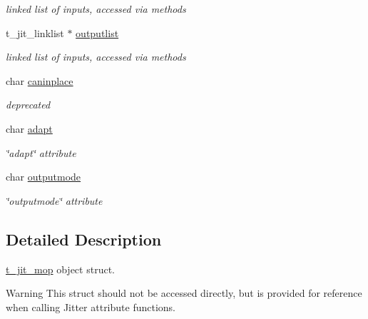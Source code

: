 \begin{DoxyCompactItemize}
\begin{DoxyCompactList}\small\item\em linked list of inputs, accessed via methods \item\end{DoxyCompactList}\item 
\hypertarget{structt__jit__mop_a2aa1e3e9da27a0eb73782d2037c97f73}{
t\_\-jit\_\-linklist $\ast$ \hyperlink{structt__jit__mop_a2aa1e3e9da27a0eb73782d2037c97f73}{outputlist}}
\label{structt__jit__mop_a2aa1e3e9da27a0eb73782d2037c97f73}

\begin{DoxyCompactList}\small\item\em linked list of inputs, accessed via methods \item\end{DoxyCompactList}\item 
\hypertarget{structt__jit__mop_a16b822869bef5cc50b3554cee5fddfeb}{
char \hyperlink{structt__jit__mop_a16b822869bef5cc50b3554cee5fddfeb}{caninplace}}
\label{structt__jit__mop_a16b822869bef5cc50b3554cee5fddfeb}

\begin{DoxyCompactList}\small\item\em deprecated \item\end{DoxyCompactList}\item 
\hypertarget{structt__jit__mop_a39634f1f344b51cf525f479e20eacf9b}{
char \hyperlink{structt__jit__mop_a39634f1f344b51cf525f479e20eacf9b}{adapt}}
\label{structt__jit__mop_a39634f1f344b51cf525f479e20eacf9b}

\begin{DoxyCompactList}\small\item\em \char`\"{}adapt\char`\"{} attribute \item\end{DoxyCompactList}\item 
\hypertarget{structt__jit__mop_a735e825a260e0f0fae102255456dc1c2}{
char \hyperlink{structt__jit__mop_a735e825a260e0f0fae102255456dc1c2}{outputmode}}
\label{structt__jit__mop_a735e825a260e0f0fae102255456dc1c2}

\begin{DoxyCompactList}\small\item\em \char`\"{}outputmode\char`\"{} attribute \item\end{DoxyCompactList}\end{DoxyCompactItemize}


\subsection{Detailed Description}
\hyperlink{structt__jit__mop}{t\_\-jit\_\-mop} object struct. \begin{DoxyWarning}{Warning}
This struct should not be accessed directly, but is provided for reference when calling Jitter attribute functions. 
\end{DoxyWarning}
